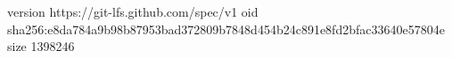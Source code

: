 version https://git-lfs.github.com/spec/v1
oid sha256:e8da784a9b98b87953bad372809b7848d454b24c891e8fd2bfac33640e57804e
size 1398246
